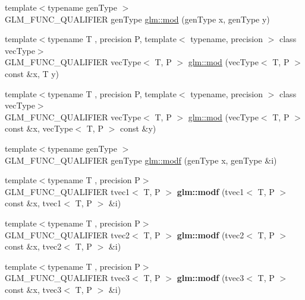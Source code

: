 \begin{DoxyCompactItemize}
\item 
{\footnotesize template$<$typename gen\-Type $>$ }\\G\-L\-M\-\_\-\-F\-U\-N\-C\-\_\-\-Q\-U\-A\-L\-I\-F\-I\-E\-R gen\-Type \hyperlink{group__core__func__common_ga12201563ef902e3b07e0d1d7656efdb1}{glm\-::mod} (gen\-Type x, gen\-Type y)
\item 
{\footnotesize template$<$typename T , precision P, template$<$ typename, precision $>$ class vec\-Type$>$ }\\G\-L\-M\-\_\-\-F\-U\-N\-C\-\_\-\-Q\-U\-A\-L\-I\-F\-I\-E\-R vec\-Type$<$ T, P $>$ \hyperlink{group__gtc__integer_ga1d3f62c015315540cebf1f915b67dd9c}{glm\-::mod} (vec\-Type$<$ T, P $>$ const \&x, T y)
\item 
{\footnotesize template$<$typename T , precision P, template$<$ typename, precision $>$ class vec\-Type$>$ }\\G\-L\-M\-\_\-\-F\-U\-N\-C\-\_\-\-Q\-U\-A\-L\-I\-F\-I\-E\-R vec\-Type$<$ T, P $>$ \hyperlink{group__gtc__integer_ga689e2d9100af0bfc4d9954c96221095e}{glm\-::mod} (vec\-Type$<$ T, P $>$ const \&x, vec\-Type$<$ T, P $>$ const \&y)
\item 
{\footnotesize template$<$typename gen\-Type $>$ }\\G\-L\-M\-\_\-\-F\-U\-N\-C\-\_\-\-Q\-U\-A\-L\-I\-F\-I\-E\-R gen\-Type \hyperlink{group__core__func__common_ga85e33f139b8db1b39b590a5713b9e679}{glm\-::modf} (gen\-Type x, gen\-Type \&i)
\item 
\hypertarget{namespaceglm_a41834d29828f9832a3c79931c9043ccf}{{\footnotesize template$<$typename T , precision P$>$ }\\G\-L\-M\-\_\-\-F\-U\-N\-C\-\_\-\-Q\-U\-A\-L\-I\-F\-I\-E\-R tvec1$<$ T, P $>$ {\bfseries glm\-::modf} (tvec1$<$ T, P $>$ const \&x, tvec1$<$ T, P $>$ \&i)}\label{namespaceglm_a41834d29828f9832a3c79931c9043ccf}

\item 
\hypertarget{namespaceglm_aaa2408e8f0b4dc150a54ab6644c17f39}{{\footnotesize template$<$typename T , precision P$>$ }\\G\-L\-M\-\_\-\-F\-U\-N\-C\-\_\-\-Q\-U\-A\-L\-I\-F\-I\-E\-R tvec2$<$ T, P $>$ {\bfseries glm\-::modf} (tvec2$<$ T, P $>$ const \&x, tvec2$<$ T, P $>$ \&i)}\label{namespaceglm_aaa2408e8f0b4dc150a54ab6644c17f39}

\item 
\hypertarget{namespaceglm_ab95650561bcf376c17813a1b09e5ff41}{{\footnotesize template$<$typename T , precision P$>$ }\\G\-L\-M\-\_\-\-F\-U\-N\-C\-\_\-\-Q\-U\-A\-L\-I\-F\-I\-E\-R tvec3$<$ T, P $>$ {\bfseries glm\-::modf} (tvec3$<$ T, P $>$ const \&x, tvec3$<$ T, P $>$ \&i)}\label{namespaceglm_ab95650561bcf376c17813a1b09e5ff41}


\end{DoxyCompactItemize}
